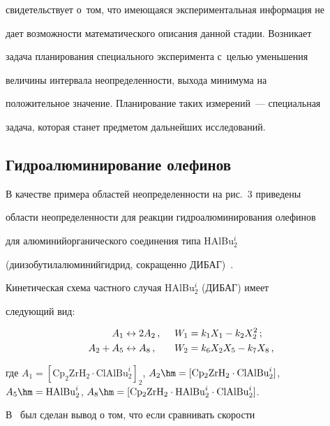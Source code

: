 свидетельствует о~том, что имеющаяся экспериментальная информация не 

дает возможности математического описания данной стадии. Возникает 

задача планирования специального эксперимента с~целью уменьшения 

величины интервала неопределенности, выхода минимума на 

положительное значение. Планирование таких измерений~--- специальная 

задача, которая станет предметом дальнейших исследований.

  

  \subsection{Гидроалюминирование олефинов}

  

  В качестве примера областей неопределенности на рис.~3 приведены 

области неопределенности для реакции гидроалюминирования олефинов 

для алю\-ми\-ний\-ор\-га\-ни\-че\-ско\-го соединения типа HAlBu$_2^i$ 

(диизобутилалюминийгидрид, сокращенно ДИБАГ)~\cite{14-sp}. 

Кинетическая схема частного случая HAlBu$_2^i$ (ДИБАГ) имеет 

следующий вид:

  \begin{alignat*}{2}

  A_1 &\leftrightarrow 2A_2\,, &\enskip W_1 &= k_1 X_1-k_2X_2^2\,;\\

  A_2+A_5&\leftrightarrow A_8\,, &\enskip W_2 &= k_6 X_2X_5 -k_7X_8\,,

  \end{alignat*}

где $A_1= [\mathrm{Cp_2ZrH_2}\cdot \mathrm{ClAlBu}_2^i]_2$, $A_2\hm= 

[\mathrm{Cp_2ZrH_2}\cdot \mathrm{ClAlBu}_2^i]$, $A_5\hm= 

\mathrm{HAlBu}_2^i$, $A_8\hm=[\mathrm{Cp_2ZrH_2}\cdot \mathrm{HAlBu}_2^i 

\cdot \mathrm{ClAlBu}_2^i]$.

  



  

  В~\cite{7-sp} был сделан вывод о том, что если сравнивать скорости 


